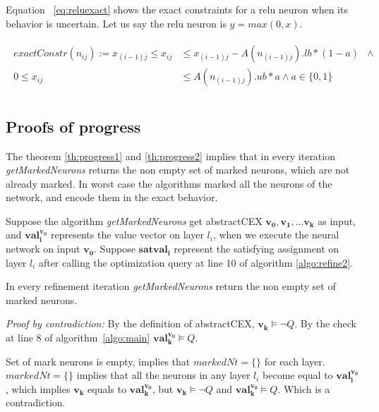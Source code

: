 Equation ~\ref{eq:reluexact} shows the exact constraints
for a relu neuron when its behavior is uncertain. Let us say the relu neuron is $y = max(0,x)$. 

\begin{align}
    \label{eq:reluexact}
    \begin{split}
      exactConstr(n_{ij}) := x_{(i-1)j} \leq x_{ij} &\leq x_{(i-1)j} - A(n_{(i-1)j}).lb*(1-a) \;\;\land  \\
        0 \leq x_{ij} &\leq A(n_{(i-1)j}).ub*a \land a \in \{0,1\} \\ 
    \end{split}
\end{align}

\subsection{Proofs of progress}
The theorem \ref{th:progress1} and \ref{th:progress2} implies that in every iteration {\em getMarkedNeurons} 
returns the non empty set of marked neurons, which are not already marked. In worst case the algorithms marked all 
the neurons of the network, and encode them in the exact behavior. 

Suppose the algorithm {\em getMarkedNeurons} get abstractCEX 
$\boldsymbol{v_0}, \boldsymbol{v_1}, ... \boldsymbol{v_k}$ as input, 
and $\boldsymbol{val_i^{\boldsymbol{v_0}}}$ represents the value vector on layer $l_i$, 
when we execute the neural network on input $\boldsymbol{v_0}$.
Suppose $\boldsymbol{satval_i}$ represent the satisfying assignment on layer $l_i$ after calling the optimization 
query at line 10 of algorithm \ref{algo:refine2}. 



\begin{theorem}
  \label{th:progress1}
  In every refinement iteration {\em getMarkedNeurons} return the non empty set of marked neurons. 
\end{theorem}

{\em Proof by contradiction:} 
By the definition of abstractCEX, $\boldsymbol{v_k} \models \lnot Q$. 
By the check at line 8 of algorithm~\ref{algo:main} $\boldsymbol{val_k^{\boldsymbol{v_0}}} \models Q$. 

Set of mark neurons is empty, implies that $markedNt = \{\}$ for each layer. 
$markedNt= \{\}$ implies that all the neurons in any layer $l_i$ become equal to $\boldsymbol{val_i^{\boldsymbol{v_0}}}$,  
which implies $\boldsymbol{v_k}$ equals to $\boldsymbol{val_k^{\boldsymbol{v_0}}}$, but $\boldsymbol{v_k} \models \lnot Q$ and 
$\boldsymbol{val_k^{\boldsymbol{v_0}}} \models Q$. Which is a contradiction. 



